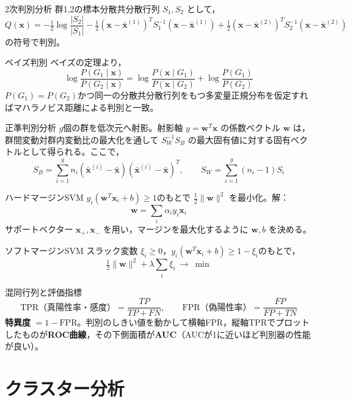\documentclass[a4paper,11pt]{ltjsarticle}
\begin{document}
\begin{term}{2次判別分析}
群1,2の標本分散共分散行列 $S_1,S_2$ として，
\[
Q(\bm x) = -\tfrac12\log\frac{|S_2|}{|S_1|} - \tfrac12(\bm x-\bar{\bm x}^{(1)})^TS_1^{-1}(\bm x-\bar{\bm x}^{(1)}) + \tfrac12(\bm x-\bar{\bm x}^{(2)})^TS_2^{-1}(\bm x-\bar{\bm x}^{(2)})
\]
の符号で判別。
\end{term}

\begin{term}{ベイズ判別}
ベイズの定理より，
\[
\log\frac{P(G_1\mid \bm x)}{P(G_2\mid \bm x)} = \log\frac{P(\bm x\mid G_1)}{P(\bm x\mid G_2)} + \log\frac{P(G_1)}{P(G_2)}
\]
$P(G_1)=P(G_2)$かつ同一の分散共分散行列をもつ多変量正規分布を仮定すればマハラノビス距離による判別と一致。
\end{term}

\begin{term}{正準判別分析}
$g$個の群を低次元へ射影。射影軸 $y=\bm w^T\bm x$ の係数ベクトル $\bm w$ は，群間変動対群内変動比の最大化を通して $S_W^{-1}S_B$ の最大固有値に対する固有ベクトルとして得られる。ここで，
\[
S_B = \sum_{i=1}^g n_i(\bar{\bm x}^{(i)}-\bar{\bm x})(\bar{\bm x}^{(i)}-\bar{\bm x})^T,
\qquad
S_W = \sum_{i=1}^g (n_i-1)S_i
\]
\end{term}

\begin{term}{ハードマージンSVM}
$y_i(\bm w^T\bm x_i+b)\ge1$のもとで $\tfrac12\|\bm w\|^2$ を最小化。解：
\[
\bm w = \sum_i \alpha_i y_i \bm x_i
\]
サポートベクター $\bm x_+,\bm x_-$ を用い，マージンを最大化するように $\bm w,b$ を決める。
\end{term}

\begin{term}{ソフトマージンSVM}
スラック変数 $\xi_i\ge0$，$y_i(\bm w^T\bm x_i+b)\ge1-\xi_i$のもとで，
\[
\tfrac12\|\bm w\|^2 + \lambda\sum_i \xi_i \ \to\ \min
\]
\end{term}

\begin{term}{混同行列と評価指標}
\[
\text{TPR（真陽性率・感度）} = \frac{TP}{TP+FN}, \qquad
\text{FPR（偽陽性率）} = \frac{FP}{FP+TN}
\]
\textbf{特異度} $=1-\text{FPR}$。判別のしきい値を動かして横軸FPR，縦軸TPRでプロットしたものが\textbf{ROC曲線}，その下側面積が\textbf{AUC}（AUCが1に近いほど判別器の性能が良い）。
\end{term}

\section{クラスター分析}
\end{document}
